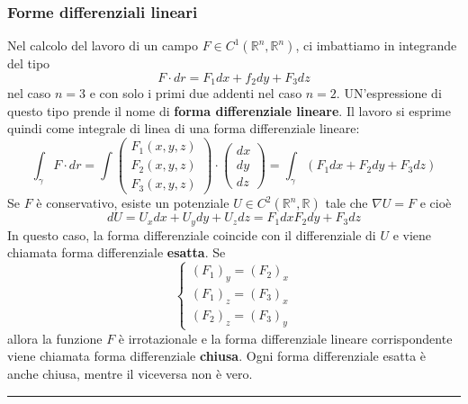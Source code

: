 \subsubsection*{Forme differenziali lineari}
Nel calcolo del lavoro di un campo $F \in C^1 (\mathbb{R}^n, \mathbb{R}^n)$, ci imbattiamo in integrande del tipo
\[
    F \cdot  dr = F_1 dx + f_2 dy + F_3 dz
\]
nel caso $n=3$ e con solo i primi due addenti nel caso $n=2$. UN'espressione di questo tipo prende il nome di \textbf{forma differenziale lineare}. Il lavoro si esprime quindi come integrale di linea di una forma differenziale lineare:
\[
    \int_\gamma F \cdot dr = \int\left(\begin{matrix}
        F_1(x,y,z)\\
        F_2(x,y,z)\\
        F_3(x,y,z)
    \end{matrix}\right) \cdot \left(\begin{matrix}
        dx\\dy\\dz
    \end{matrix}\right) = \int_\gamma (F_1 dx + F_2 dy + F_3 dz)
\] 
\newline
Se $F$ è conservativo, esiste un potenziale $U \in C^2(\mathbb{R}^n, \mathbb{R})$ tale che $\nabla U = F$ e cioè
\[
    dU = U_x dx + U_y dy + U_z dz = F_1 dx F_2 dy + F_3 dz
\]
In questo caso, la forma differenziale coincide con il differenziale di $U$ e viene chiamata forma differenziale \textbf{esatta}.\newline
\newline
Se 
\[
    \begin{cases}
        (F_1)_y =(F_2)_x\\
        (F_1)_z =(F_3)_x\\
        (F_2)_z =(F_3)_y
    \end{cases}
\]
allora la funzione $F$ è irrotazionale e la forma differenziale lineare corrispondente viene chiamata forma differenziale \textbf{chiusa}.\newline
\newline
Ogni forma differenziale esatta è anche chiusa, mentre il viceversa non è vero.\newline
\rule{\textwidth}{2pt}
